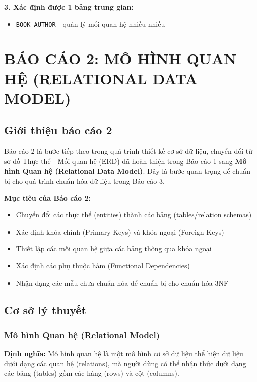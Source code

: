 \documentclass[12pt,a4paper]{article}
\newcommand{\entity}[1]{\texttt{#1}}
\begin{document}
\textbf{3. Xác định được 1 bảng trung gian:}
\begin{itemize}
    \item \entity{BOOK\_AUTHOR} - quản lý mối quan hệ nhiều-nhiều
\end{itemize}


\newpage
\section{BÁO CÁO 2: MÔ HÌNH QUAN HỆ (RELATIONAL DATA MODEL)}

\subsection{Giới thiệu báo cáo 2}

Báo cáo 2 là bước tiếp theo trong quá trình thiết kế cơ sở dữ liệu, chuyển đổi từ sơ đồ Thực thể - Mối quan hệ (ERD) đã hoàn thiện trong Báo cáo 1 sang \textbf{Mô hình Quan hệ (Relational Data Model)}. Đây là bước quan trọng để chuẩn bị cho quá trình chuẩn hóa dữ liệu trong Báo cáo 3.

\textbf{Mục tiêu của Báo cáo 2:}
\begin{itemize}
    \item Chuyển đổi các thực thể (entities) thành các bảng (tables/relation schemas)
    \item Xác định khóa chính (Primary Keys) và khóa ngoại (Foreign Keys)
    \item Thiết lập các mối quan hệ giữa các bảng thông qua khóa ngoại
    \item Xác định các phụ thuộc hàm (Functional Dependencies)
    \item Nhận dạng các mẫu chưa chuẩn hóa để chuẩn bị cho chuẩn hóa 3NF
\end{itemize}

\subsection{Cơ sở lý thuyết}

\subsubsection{Mô hình Quan hệ (Relational Model)}

\textbf{Định nghĩa:} Mô hình quan hệ là một mô hình cơ sở dữ liệu thể hiện dữ liệu dưới dạng các quan hệ (relations), mà người dùng có thể nhận thức dưới dạng các bảng (tables) gồm các hàng (rows) và cột (columns).
\end{document}
